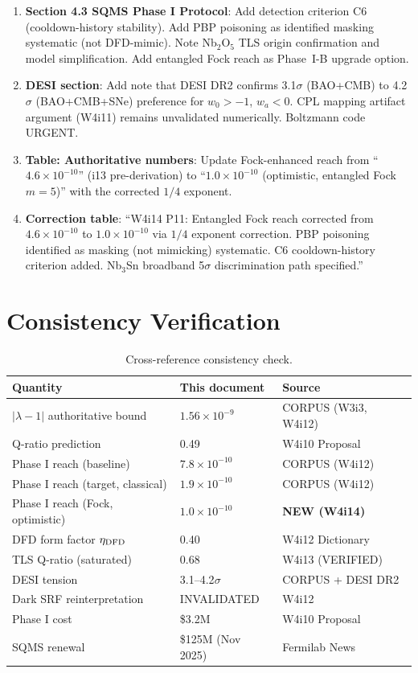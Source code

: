 \documentclass[11pt]{article}
\newcommand{\lbone}{|\lambda - 1|}
\newcommand{\ee}[1]{\times 10^{#1}}
\theoremstyle{definition}
\theoremstyle{remark}
\begin{document}
\begin{enumerate}
\item \textbf{Section 4.3 SQMS Phase I Protocol}: Add detection
  criterion C6 (cooldown-history stability). Add PBP poisoning as
  identified masking systematic (not DFD-mimic). Note Nb$_2$O$_5$
  TLS origin confirmation and model simplification. Add entangled
  Fock reach as Phase~I-B upgrade option.

\item \textbf{DESI section}: Add note that DESI DR2 confirms
  3.1$\sigma$ (BAO+CMB) to 4.2$\sigma$ (BAO+CMB+SNe) preference
  for $w_0 > -1$, $w_a < 0$. CPL mapping artifact argument
  (W4i11) remains unvalidated numerically. Boltzmann code URGENT.

\item \textbf{Table: Authoritative numbers}: Update Fock-enhanced
  reach from ``$4.6\ee{-10}$'' (i13 pre-derivation) to
  ``$1.0\ee{-10}$ (optimistic, entangled Fock $m=5$)'' with the
  corrected $1/4$ exponent.

\item \textbf{Correction table}: ``W4i14 P11: Entangled Fock reach
  corrected from $4.6\ee{-10}$ to $1.0\ee{-10}$ via $1/4$ exponent
  correction. PBP poisoning identified as masking (not mimicking)
  systematic. C6 cooldown-history criterion added. Nb$_3$Sn
  broadband 5$\sigma$ discrimination path specified.''
\end{enumerate}


\section{Consistency Verification}

\begin{table}[H]
\centering
\caption{Cross-reference consistency check.}
\label{tab:consistency}
\renewcommand{\arraystretch}{1.25}
\begin{tabular}{@{}lll@{}}
\toprule
\textbf{Quantity} & \textbf{This document} & \textbf{Source} \\
\midrule
$\lbone$ authoritative bound & $1.56\ee{-9}$ & CORPUS (W3i3, W4i12) \\
Q-ratio prediction & 0.49 & W4i10 Proposal \\
Phase I reach (baseline) & $7.8\ee{-10}$ & CORPUS (W4i12) \\
Phase I reach (target, classical) & $1.9\ee{-10}$ & CORPUS (W4i12) \\
Phase I reach (Fock, optimistic) & $1.0\ee{-10}$ & \textbf{NEW (W4i14)} \\
DFD form factor $\eta_{\rm DFD}$ & 0.40 & W4i12 Dictionary \\
TLS Q-ratio (saturated) & 0.68 & W4i13 (VERIFIED) \\
DESI tension & 3.1--4.2$\sigma$ & CORPUS + DESI DR2 \\
Dark SRF reinterpretation & INVALIDATED & W4i12 \\
Phase I cost & \$3.2M & W4i10 Proposal \\
SQMS renewal & \$125M (Nov 2025) & Fermilab News \\
\bottomrule
\end{tabular}
\end{table}
\end{document}
